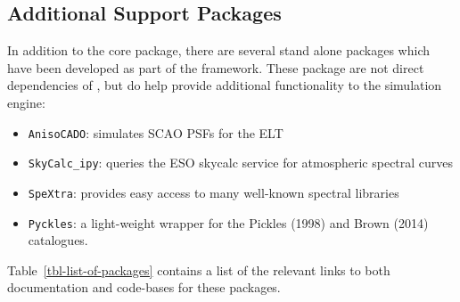 \subsection{Additional Support Packages}
\label{support-packages}

In addition to the core package, there are several stand alone packages which have been developed as part of the \ScopeSim{} framework. 
These package are not direct dependencies of \ScopeSim{}, but do help provide additional functionality to the simulation engine:

\begin{itemize}
\item \lstinline{AnisoCADO}: simulates SCAO PSFs for the ELT

\item \lstinline{SkyCalc_ipy}: queries the ESO skycalc service for atmospheric spectral curves

\item \lstinline{SpeXtra}: provides easy access to many well-known spectral libraries

\item \lstinline{Pyckles}: a light-weight wrapper for the Pickles (1998)\cite{pickles1998} and Brown (2014)\cite{brown2014} catalogues.
\end{itemize}


Table~\ref{tbl-list-of-packages} contains a list of the relevant links to both documentation and code-bases for these packages.

